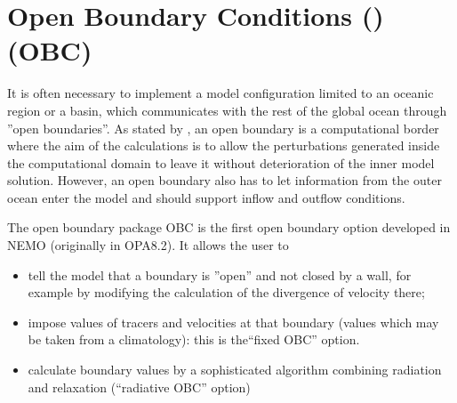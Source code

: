 \section{Open Boundary Conditions () (OBC)}
\label{LBC_obc}

It is often necessary to implement a model configuration limited to an oceanic 
region or a basin, which communicates with the rest of the global ocean through 
''open boundaries''. As stated by \citet{Roed1986}, an open boundary is a 
computational border where the aim of the calculations is to allow the perturbations 
generated inside the computational domain to leave it without deterioration of the 
inner model solution. However, an open boundary also has to let information from 
the outer ocean enter the model and should support inflow and outflow conditions. 

The open boundary package OBC is the first open boundary option developed in 
NEMO (originally in OPA8.2). It allows the user to 
\begin{itemize}
\item tell the model that a boundary is ''open'' and not closed by a wall, for example 
by modifying the calculation of the divergence of velocity there;
\item impose values of tracers and velocities at that boundary (values which may 
be taken from a climatology): this is the``fixed OBC'' option. 
\item calculate boundary values by a sophisticated algorithm combining radiation 
and relaxation (``radiative OBC'' option)
\end{itemize}

